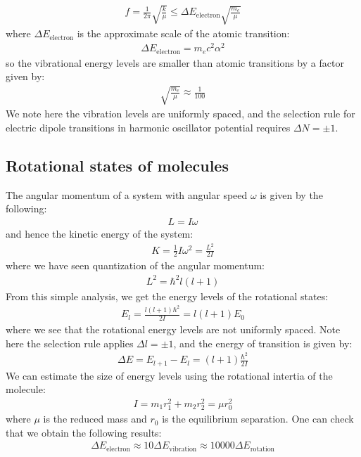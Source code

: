 \documentclass[11pt]{article}
\theoremstyle{break}
\theoremstyle{break}
\begin{document}
\begin{align*}
f = \frac{1}{2\pi}\sqrt{\frac{k}{\mu}} \leq  \Delta E_{\text{electron}} \sqrt{\frac{m_e}{\mu}}
\end{align*}
where $\Delta E_{\text{electron}}$ is the approximate scale of the atomic transition:
\begin{align*}
\Delta E_{\text{electron}} = m_ec^2 \alpha^2
\end{align*}
so the vibrational energy levels are smaller than atomic transitions by a factor given by:
\begin{align*}
\sqrt{\frac{m_e}{\mu}} \approx \frac{1}{100}
\end{align*}
We note here the vibration levels are uniformly spaced, and the selection rule for electric dipole transitions in harmonic oscillator potential requires $\Delta N = \pm 1$. 

\subsection{Rotational states of molecules}
The angular momentum of a system with angular speed $\omega$ is given by the following:
\begin{align*}
L = I\omega
\end{align*}
and hence the kinetic energy of the system:
\begin{align*}
K = \frac{1}{2}I\omega^2 = \frac{L^2}{2I}
\end{align*}
where we have seen quantization of the angular momentum:
\begin{align*}
L^2 = \hbar^2 l (l+1)
\end{align*}
From this simple analysis, we get the energy levels of the rotational states:
\begin{align*}
E_l = \frac{l(l+1)\hbar^2}{2I} = l(l+1)E_0
\end{align*}
where we see that the rotational energy levels are not uniformly spaced. Note here the selection rule applies $\Delta l = \pm 1$, and the energy of transition is given by:
\begin{align*}
\Delta E = E_{l+1}-E_l = (l+1) \frac{\hbar^2}{2I}
\end{align*}
We can estimate the size of energy levels using the rotational intertia of the molecule:
\begin{align*}
I = m_1r_1^2 + m_2 r_2^2 = \mu r_0^2
\end{align*}
where $\mu$ is the reduced mass and $r_0$ is the equilibrium separation. One can check that we obtain the following results:
\begin{align*}
\Delta E_{\text{electron}}\approx 10 \Delta E_{\text{vibration}} \approx  10000\Delta E_{\text{rotation}}
\end{align*}
\end{document}
